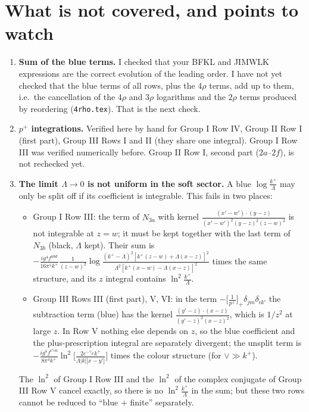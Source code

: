 \documentclass[9pt]{article}
\numberwithin{equation}{section}
\begin{document}
\section{What is not covered, and points to watch}\label{sec:open}
\begin{enumerate}
\item \textbf{Sum of the blue terms.} I checked that your BFKL and JIMWLK expressions are the correct evolution of the leading order. I have not yet checked that the blue terms of all rows, plus the $4\rho$ terms, add up to them, i.e.\ the cancellation of the $4\rho$ and $3\rho$ logarithms and the $2\rho$ terms produced by reordering (\texttt{4rho.tex}). That is the next check.
\item \textbf{$p^{+}$ integrations.} Verified here by hand for Group I Row IV, Group II Row I (first part), Group III Rows I and II (they share one integral). Group I Row III was verified numerically before. Group II Row I, second part ($2a$--$2f$), is not rechecked yet.
\item \textbf{The limit $\Lambda\to0$ is not uniform in the soft sector.} A blue $\log\frac{k^{+}}{\Lambda}$ may only be split off if its coefficient is integrable. This fails in two places:
 \begin{itemize}
 \item Group I Row III: the term of $N_{3a}$ with kernel $\frac{(x'-w')\cdot(y-z)}{(x'-w')^{2}(y-z)^{2}(z-w)^{2}}$ is not integrable at $z=w$; it must be kept together with the last term of $N_{3b}$ (black, $\Lambda$ kept). Their sum is $-\frac{ig^{4}f^{abd}}{16\pi^{5}k^{+}}\frac{1}{(z-w)^{2}}\log\frac{(k^{+}-\Lambda)^{2}[k^{+}(z-w)+\Lambda(x-z)]^{2}}{\Lambda^{2}[k^{+}(x-w)-\Lambda(x-z)]^{2}}$ times the same structure, and its $z$ integral contains $\ln^{2}\frac{k^{+}}{\Lambda}$.
 \item Group III Rows III (first part), V, VI: in the term $-\big[\frac{1}{p^{+}}\big]_{+}\delta_{jm}\delta_{ik'}$ the subtraction term (blue) has the kernel $\frac{(y'-z)\cdot(x-z)}{(y'-z)^{2}(x-z)^{2}}$, which is $1/z^{2}$ at large $z$. In Row V nothing else depends on $z$, so the blue coefficient and the plus-prescription integral are separately divergent; the unsplit term is $-\frac{ig^{4}f^{c'ca}}{8\pi^{4}k^{+}}\ln^{2}\!\big[\frac{2e^{-\gamma_{E}}k^{+}}{\Lambda|k||x-y'|}\big]$ times the colour structure (for $\vee\gg k^{+}$).
 \end{itemize}
 The $\ln^{2}$ of Group I Row III and the $\ln^{2}$ of the complex conjugate of Group III Row V cancel exactly, so there is no $\ln^{2}\frac{k^{+}}{\Lambda}$ in the sum; but these two rows cannot be reduced to ``blue $+$ finite'' separately.

\end{enumerate}
\end{document}
